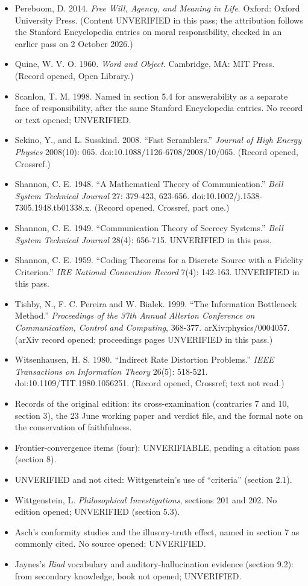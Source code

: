 \documentclass[11pt]{article}
\begin{document}
\begin{itemize}
\item Pereboom, D. 2014. \emph{Free Will, Agency, and Meaning in Life}. Oxford: Oxford University Press. (Content UNVERIFIED in this pass; the attribution follows the Stanford Encyclopedia entries on moral responsibility, checked in an earlier pass on 2 October 2026.)
\item Quine, W. V. O. 1960. \emph{Word and Object}. Cambridge, MA: MIT Press. (Record opened, Open Library.)
\item Scanlon, T. M. 1998. Named in section 5.4 for answerability as a separate face of responsibility, after the same Stanford Encyclopedia entries. No record or text opened; UNVERIFIED.
\item Sekino, Y., and L. Susskind. 2008. ``Fast Scramblers.'' \emph{Journal of High Energy Physics} 2008(10): 065. doi:10.1088/\allowbreak{}1126-6708/\allowbreak{}2008/\allowbreak{}10/\allowbreak{}065. (Record opened, Crossref.)
\item Shannon, C. E. 1948. ``A Mathematical Theory of Communication.'' \emph{Bell System Technical Journal} 27: 379-423, 623-656. doi:10.1002/\allowbreak{}j.1538-7305.1948.tb01338.x. (Record opened, Crossref, part one.)
\item Shannon, C. E. 1949. ``Communication Theory of Secrecy Systems.'' \emph{Bell System Technical Journal} 28(4): 656-715. UNVERIFIED in this pass.
\item Shannon, C. E. 1959. ``Coding Theorems for a Discrete Source with a Fidelity Criterion.'' \emph{IRE National Convention Record} 7(4): 142-163. UNVERIFIED in this pass.
\item Tishby, N., F. C. Pereira and W. Bialek. 1999. ``The Information Bottleneck Method.'' \emph{Proceedings of the 37th Annual Allerton Conference on Communication, Control and Computing}, 368-377. arXiv:physics/\allowbreak{}0004057. (arXiv record opened; proceedings pages UNVERIFIED in this pass.)
\item Witsenhausen, H. S. 1980. ``Indirect Rate Distortion Problems.'' \emph{IEEE Transactions on Information Theory} 26(5): 518-521. doi:10.1109/\allowbreak{}TIT.1980.1056251. (Record opened, Crossref; text not read.)
\item Records of the original edition: its cross-examination (contraries 7 and 10, section 3), the 23 June working paper and verdict file, and the formal note on the conservation of faithfulness.
\item Frontier-convergence items (four): UNVERIFIABLE, pending a citation pass (section 8).
\item UNVERIFIED and not cited: Wittgenstein's use of ``criteria'' (section 2.1).
\item Wittgenstein, L. \emph{Philosophical Investigations}, sections 201 and 202. No edition opened; UNVERIFIED (section 5.3).
\item Asch's conformity studies and the illusory-truth effect, named in section 7 as commonly cited. No source opened; UNVERIFIED.
\item Jaynes's \emph{Iliad} vocabulary and auditory-hallucination evidence (section 9.2): from secondary knowledge, book not opened; UNVERIFIED.
\end{itemize}
\end{document}
